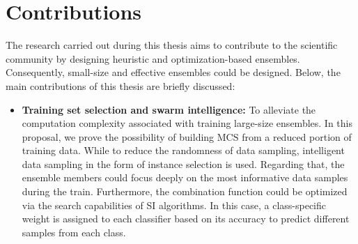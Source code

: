 \section{Contributions}
\label{sec:1_3_1_goal}

The research carried out during this thesis aims to contribute to the scientific community by designing heuristic and optimization-based ensembles. Consequently, small-size and effective ensembles could be designed. Below, the main contributions of this thesis are briefly discussed:

\begin{itemize}

    \item \textbf{Training set selection and swarm intelligence:} To alleviate the computation complexity associated with training large-size ensembles. In this proposal, we prove the possibility of building MCS from a reduced portion of training data. While to reduce the randomness of data sampling, intelligent data sampling in the form of instance selection is used. Regarding that, the ensemble members could focus deeply on the most informative data samples during the train. Furthermore, the combination function could be optimized via the search capabilities of SI algorithms. In this case, a class-specific weight is assigned to each classifier based on its accuracy to predict different samples from each class.
    

\end{itemize}
